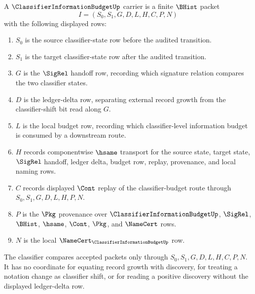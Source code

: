 \begin{definition}
\label{def:classifier-information-budget-carrier}
A $\ClassifierInformationBudgetUp$ carrier is a finite $\BHist$ packet
$$
I=(S_0,S_1,G,D,L,H,C,P,N)
$$
with the following displayed rows:
\begin{enumerate}
\item $S_0$ is the source classifier-state row before the audited transition.
\item $S_1$ is the target classifier-state row after the audited transition.
\item $G$ is the $\SigRel$ handoff row, recording which signature relation compares the two classifier states.
\item $D$ is the ledger-delta row, separating external record growth from the classifier-shift bit read along $G$.
\item $L$ is the local budget row, recording which classifier-level information budget is consumed by a downstream route.
\item $H$ records componentwise $\hsame$ transport for the source state, target state, $\SigRel$ handoff, ledger delta, budget row, replay, provenance, and local naming rows.
\item $C$ records displayed $\Cont$ replay of the classifier-budget route through $S_0,S_1,G,D,L,H,P,N$.
\item $P$ is the $\Pkg$ provenance over $\ClassifierInformationBudgetUp$, $\SigRel$, $\BHist$, $\hsame$, $\Cont$, $\Pkg$, and $\NameCert$ rows.
\item $N$ is the local $\NameCert_{\ClassifierInformationBudgetUp}$ row.
\end{enumerate}
The classifier compares accepted packets only through $S_0,S_1,G,D,L,H,C,P,N$. It has no coordinate for equating record growth with discovery, for treating a notation change as classifier shift, or for reading a positive discovery without the displayed ledger-delta row.
\end{definition}

